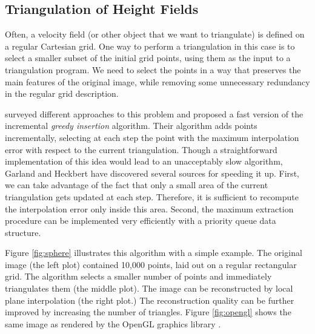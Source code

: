 \subsection{Triangulation of Height Fields}

Often, a velocity field (or other object that we want to triangulate)
is defined on a regular Cartesian grid. One way to perform a
triangulation in this case is to select a smaller subset of the
initial grid points, using them as the input to a triangulation
program. We need to select the points in a way that preserves the main
features of the original image, while removing some unnecessary
redundancy in the regular grid description.

\par
\cite{height} surveyed different approaches
to this problem and proposed a fast version of the incremental
\emph{greedy insertion} algorithm. Their algorithm adds points
incrementally, selecting at each step the point with the maximum
interpolation error with respect to the current triangulation. Though
a straightforward implementation of this idea would lead to an
unacceptably slow algorithm, Garland and Heckbert have discovered
several sources for speeding it up. First, we can take advantage of
the fact that only a small area of the current triangulation gets
updated at each step. Therefore, it is sufficient to recompute the
interpolation error only inside this area. Second, the maximum
extraction procedure can be implemented very efficiently with a
priority queue data structure.


\par
Figure \ref{fig:sphere} illustrates this algorithm with a simple
example. The original image (the left plot) contained 10,000 points,
laid out on a regular rectangular grid. The algorithm selects a
smaller number of points and immediately triangulates them (the middle
plot).  The image can be reconstructed by local plane interpolation
(the right plot.) The reconstruction quality can be further improved
by increasing the number of triangles. Figure \ref{fig:opengl} shows
the same image as rendered by the OpenGL graphics library
\cite[]{opengl}.


